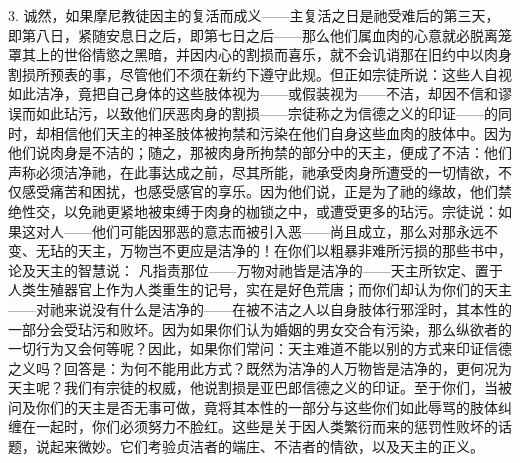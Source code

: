 3. 诚然，如果摩尼教徒因主的复活而成义——主复活之日是祂受难后的第三天，即第八日，紧随安息日之后，即第七日之后——那么他们属血肉的心意就必脱离笼罩其上的世俗情慾之黑暗，并因内心的割损而喜乐，就不会讥诮那在旧约中以肉身割损所预表的事，尽管他们不须在新约下遵守此规。但正如宗徒所说：这些人自视如此洁净，竟把自己身体的这些肢体视为——或假装视为——不洁，却因不信和谬误而如此玷污，以致他们厌恶肉身的割损——宗徒称之为信德之义的印证——的同时，却相信他们天主的神圣肢体被拘禁和污染在他们自身这些血肉的肢体中。因为他们说肉身是不洁的；随之，那被肉身所拘禁的部分中的天主，便成了不洁：他们声称必须洁净祂，在此事达成之前，尽其所能，祂承受肉身所遭受的一切情欲，不仅感受痛苦和困扰，也感受感官的享乐。因为他们说，正是为了祂的缘故，他们禁绝性交，以免祂更紧地被束缚于肉身的枷锁之中，或遭受更多的玷污。宗徒说：如果这对人——他们可能因邪恶的意志而被引入恶——尚且成立，那么对那永远不变、无玷的天主，万物岂不更应是洁净的！在你们以粗暴非难所污损的那些书中，论及天主的智慧说： 凡指责那位——万物对祂皆是洁净的——天主所钦定、置于人类生殖器官上作为人类重生的记号，实在是好色荒唐；而你们却认为你们的天主——对祂来说没有什么是洁净的——在被不洁之人以自身肢体行邪淫时，其本性的一部分会受玷污和败坏。因为如果你们认为婚姻的男女交合有污染，那么纵欲者的一切行为又会何等呢？因此，如果你们常问：天主难道不能以别的方式来印证信德之义吗？回答是：为何不能用此方式？既然为洁净的人万物皆是洁净的，更何况为天主呢？我们有宗徒的权威，他说割损是亚巴郎信德之义的印证。至于你们，当被问及你们的天主是否无事可做，竟将其本性的一部分与这些你们如此辱骂的肢体纠缠在一起时，你们必须努力不脸红。这些是关于因人类繁衍而来的惩罚性败坏的话题，说起来微妙。它们考验贞洁者的端庄、不洁者的情欲，以及天主的正义。\par

